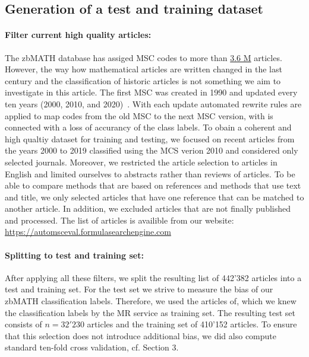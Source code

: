 \subsection{Generation of a test and training dataset}
\paragraph{Filter current high quality articles:}
The zbMATH database has assiged MSC codes to more than
\href{https://zbmath.org/?q=cc%3A*}%
{3.6 M} articles.
However, the way how mathematical articles are written changed in the last century and the classification of historic articles is not something we aim to investigate in this article.
The first MSC was created in 1990 and updated every ten years (2000, 2010, and 2020)~\cite{MSC2010}.
With each update automated rewrite rules are applied to map codes from the old MSC to the next MSC version, with is connected with a loss of accurancy of the class labels.
To obain a coherent and high qualtiy dataset for training and testing, we focused on recent articles from the years 2000 to 2019 classified using the MCS verion 2010 and considered only selected journals.
Moreover, we restricted the article selection to articles in English and limited ourselves to abstracts rather than reviews of articles.
To be able to compare methods that are based on references and methods that use text and title, we only selected articles that have one reference that
can be matched to another article.
In addition, we excluded articles that are not finally published and processed. The list of articles is availible from our website: \url{https://automsceval.formulasearchengine.com}
\paragraph{Splitting to test and training set:}
After applying all these filters, we split the resulting list of 442'382 articles into a test and training set.
For the test set we strive to measure the bias of our zbMATH classification labels.
Therefore, we used the articles of, which we knew the classification labels by the MR service as training set.
The resulting test set consists of $n=32'230$ articles and the training set of 410'152 articles.
To ensure that this selection does not introduce additional bias, we did also compute standard ten-fold cross validation, cf. Section 3.
